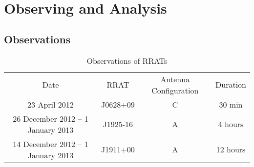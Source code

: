 \section{Observing and Analysis}

\subsection{Observations}

\begin{table} 
    \begin{tabular}{ c c c c }
        Date & RRAT & Antenna Configuration & Duration \\ 
         23 April 2012 & J0628+09 & C & 30 min \\ 
         26 December 2012 -- 1 January 2013 & J1925-16 & A & 4 hours \\ 
         14 December 2012 -- 1 January 2013 & J1911+00 & A & 12 hours \\
    \end{tabular} 
    \caption{Observations of RRATs} 
\end{table}